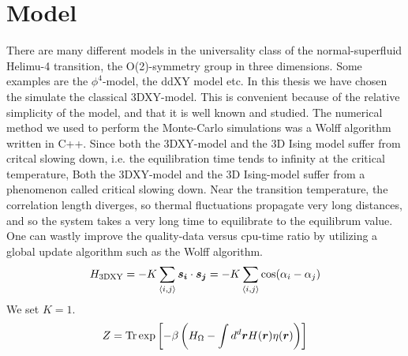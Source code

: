 \section{Model}
There are many different models in the universality class of the normal-superfluid Helimu-4 transition, the O(2)-symmetry group in three dimensions. Some examples are the $\phi^4$-model, the ddXY model etc.
In this thesis we have chosen the simulate the classical 3DXY-model. This is convenient because of the relative simplicity of the model, and that it is well known and studied.
The numerical method we used to perform the Monte-Carlo simulations was a Wolff algorithm written in C++. Since both the 3DXY-model and the 3D Ising model suffer from critcal slowing down, i.e. the equilibration time tends to infinity at the critical temperature, 
Both the 3DXY-model and the 3D Ising-model suffer from a phenomenon called critical slowing down. Near the transition temperature, the correlation length diverges, so thermal fluctuations propagate very long distances, and so the system takes a very long time to equilibrate to the equilibrum value.
One can wastly improve the quality-data versus cpu-time ratio by utilizing a global update algorithm such as the Wolff algorithm. 
\begin{equation}
  H_{\textrm{3DXY}} = -K\sum\limits_{\langle i,j\rangle} \bm{s_i}\cdot\bm{s_j} = -K\sum\limits_{\langle i,j\rangle} \cos(\alpha_i - \alpha_j)
\end{equation}
We set $K=1$.
\begin{equation}
  Z = \textrm{Tr} \exp\left[-\beta \left( H_\Omega - \int d^d \bm{r} H(\bm{r})\eta(\bm{r})\right)\right]
\end{equation}
\begin{equation}
  \label{}
\end{equation}
